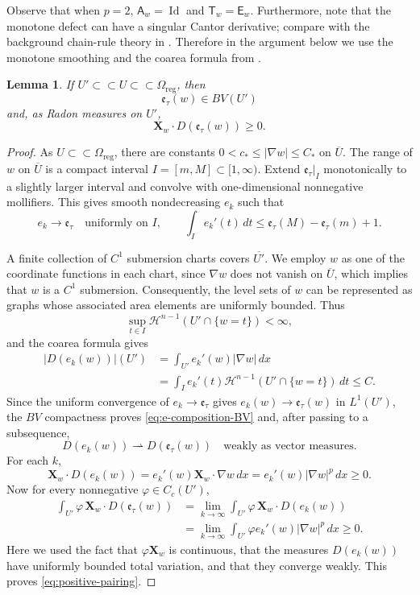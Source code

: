 \documentclass[reqno,12pt]{amsart}
\numberwithin{equation}{section}
\newtheorem{lem}[thm]{Lemma}
\theoremstyle{remark}
\newcommand{\dd}{\,d}
\newcommand{\Id}{\operatorname{Id}}
\newcommand{\Xbf}{\mathbf X}
\newcommand{\weakto}{\rightharpoonup}
\begin{document}
Observe that when $p=2$, $\mathsf A_w=\Id$ and $\mathsf T_w=\mathsf E_w$. 
Furthermore, note that the monotone defect can have a singular Cantor derivative; compare with the background chain-rule theory in \cite{AD1990}.  Therefore in the argument below we use the monotone smoothing and the coarea formula from \cite{EG2015}.

\begin{lem}\label{lem:BV-composition}
If $U'\subset\subset U\subset\subset\Omega_{\mathrm{reg}}$, then
\begin{equation}\label{eq:e-composition-BV}
\mathfrak e_\tau(w)\in BV(U')
\end{equation}
and, as Radon measures on $U'$,
\begin{equation}\label{eq:positive-pairing}
\Xbf_w\cdot D(\mathfrak e_\tau(w))\ge0.
\end{equation}
\end{lem}

\begin{proof}
As $U\subset\subset\Omega_{\mathrm{reg}}$, there are constants $0<c_*\le|\nabla w|\le C_*$ on $\overline U$.  The range of $w$ on $\overline U$ is a compact interval $I=[m,M]\subset[1,\infty)$.  Extend $\mathfrak e_\tau|_I$ monotonically to a slightly larger interval and convolve with one-dimensional nonnegative mollifiers.  This gives smooth nondecreasing $e_k$ such that
$$
e_k\to\mathfrak e_\tau\quad\text{uniformly on }I,
\qquad
\int_Ie_k'(t)\dd t
\le \mathfrak e_\tau(M)-\mathfrak e_\tau(m)+1.
$$

A finite collection of $C^1$ submersion charts covers
$\overline{U'}$. We employ $w$ as one of the coordinate functions in each chart, since $\nabla w$ does not vanish on $\overline{U}$, which implies that $w$ is a $C^{1}$ submersion. Consequently, the level sets of $w$ can be represented as graphs whose associated area elements are uniformly bounded. Thus 
$$
\sup_{t\in I} \mathcal H^{n-1}(U'\cap\{w=t\})<\infty,
$$
and the coarea formula gives
\begin{align*}
 |D(e_k(w))|(U')
 &=\int_{U'}e_k'(w)|\nabla w|\dd x\\
 &=\int_Ie_k'(t) \mathcal H^{n-1}(U'\cap\{w=t\})\dd t\le C.
\end{align*}
Since the uniform convergence of $e_k \to \mathfrak e_\tau$ gives $e_k(w)\to\mathfrak e_\tau(w)$ in $L^1(U')$, the  $BV$ compactness proves \eqref{eq:e-composition-BV} and, after passing to a subsequence,
$$
D(e_k(w))\weakto D(\mathfrak e_\tau(w)) \quad\text{weakly as vector measures}.
$$
For each $k$,
$$
 \Xbf_w\cdot D(e_k(w))  =e_k'(w)\Xbf_w\cdot\nabla w\dd x
 =e_k'(w)|\nabla w|^p\dd x\ge 0.
$$
Now for every nonnegative $\varphi\in C_c(U')$,
\begin{align*}
 \int_{U'}\varphi\,\Xbf_w\cdot
 D(\mathfrak e_\tau(w))
 &=\lim_{k\to\infty}
 \int_{U'}\varphi\,\Xbf_w\cdot D(e_k(w))\\
 &=\lim_{k\to\infty}
 \int_{U'}\varphi e_k'(w)|\nabla w|^p\,dx
 \ge 0.
\end{align*}
Here we used the fact that $\varphi \Xbf_w$ is continuous, that the measures $D(e_k(w))$ have uniformly bounded total variation, and that they converge weakly. This proves \eqref{eq:positive-pairing}.
\end{proof}
\end{document}
